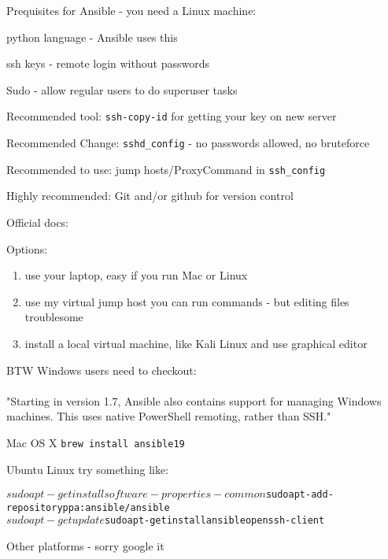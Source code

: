 \documentclass[18pt,landscape,a4paper,footrule]{foils}
\begin{document}


Prequisites for Ansible - you need a Linux machine:
\begin{list2}
\item python language - Ansible uses this
\item ssh keys - remote login without passwords
\item Sudo - allow regular users to do superuser tasks
\item Recommended tool: \verb+ssh-copy-id+ for getting your key on new server
\item Recommended Change: \verb+sshd_config+ - no passwords allowed, no bruteforce
\item Recommended to use: jump hosts/ProxyCommand in \verb+ssh_config+
\item Highly recommended: Git and/or github for version control
\end{list2}

Official docs:\\

Options:
\begin{enumerate}
\item use your laptop, easy if you run Mac or Linux
\item use my virtual jump host you can run commands - but editing files troublesome
\item install a local virtual machine, like Kali Linux and use graphical editor
\end{enumerate}

BTW Windows users need to checkout:\\
\\
"Starting in version 1.7, Ansible also contains support for managing Windows\\
 machines. This uses native PowerShell remoting, rather than SSH."


\begin{list2}
\item Mac OS X \verb+brew install ansible19+
\item Ubuntu Linux try something like:
\begin{alltt}
$ sudo apt-get install software-properties-common
$ sudo apt-add-repository ppa:ansible/ansible
$ sudo apt-get update
$ sudo apt-get install ansible openssh-client
\end{alltt}

\item Other platforms - sorry google it
\end{list2}
\end{document}
